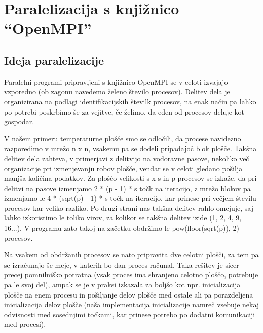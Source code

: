 \documentclass[a4paper,titlepage,11pt]{article}
\begin{document}
\pagebreak

\section{Paralelizacija s knjižnico ``OpenMPI''}
\label{poglavje-mpi}

\subsection{Ideja paralelizacije}

Paralelni programi pripravljeni s knjižnico OpenMPI se v celoti izvajajo vzporedno (ob zagonu navedemo želeno število procesov). Delitev dela je organizirana na podlagi identifikacijskih številk procesov, na enak način pa lahko po potrebi poskrbimo še za vejitve, če želimo, da eden od procesov deluje kot gospodar.

V našem primeru temperaturne plošče smo se odločili, da procese navidezno razporedimo v mrežo n x n, vsakemu pa se dodeli pripadajoč blok plošče. Takšna delitev dela zahteva, v primerjavi z delitvijo na vodoravne pasove, nekoliko več organizacije pri izmenjevanju robov plošče, vendar se v celoti gledano pošilja manjša količina podatkov. Za ploščo velikosti s x s in p procesov se izkaže, da pri delitvi na pasove izmenjamo 2 * (p - 1) * s točk na iteracijo, z mrežo blokov pa izmenjamo le 4 * (sqrt(p) - 1) * s točk na iteracijo, kar prinese pri večjem številu procesov kar veliko razliko. Po drugi strani nas takšna delitev rahlo omejuje, saj lahko izkoristimo le toliko virov, za kolikor se takšna delitev izide (1, 2, 4, 9, 16...). V programu zato takoj na začetku obdržimo le pow(floor(sqrt(p)), 2) procesov.

Na vsakem od obdržanih procesov se nato pripravita dve celotni plošči, za tem pa se izračunajo še meje, v katerih bo dan proces računal. Taka rešitev je sicer precej pomnilniško potratna (vsak proces ima shranjeno celotno ploščo, potrebuje pa le svoj del), ampak se je v praksi izkazala za boljšo kot npr. inicializacija plošče na enem procesu in pošiljanje delov plošče med ostale ali pa porazdeljena inicializacija delov plošče (naša implementacija inicializacije namreč vsebuje nekaj odvisnosti med sosednjimi točkami, kar prinese potrebo po dodatni komunikaciji med procesi).
\end{document}
